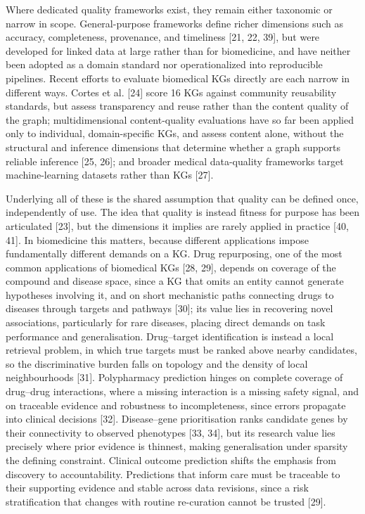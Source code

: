 Where dedicated quality frameworks exist, they remain either taxonomic or narrow in scope. General-purpose frameworks define richer dimensions such as accuracy, completeness, provenance, and timeliness {[}21, 22, 39{]}, but were developed for linked data at large rather than for biomedicine, and have neither been adopted as a domain standard nor operationalized into reproducible pipelines. Recent efforts to evaluate biomedical KGs directly are each narrow in different ways. Cortes et al. {[}24{]} score 16 KGs against community reusability standards, but assess transparency and reuse rather than the content quality of the graph; multidimensional content-quality evaluations have so far been applied only to individual, domain-specific KGs, and assess content alone, without the structural and inference dimensions that determine whether a graph supports reliable inference {[}25, 26{]}; and broader medical data-quality frameworks target machine-learning datasets rather than KGs {[}27{]}.

Underlying all of these is the shared assumption that quality can be defined once, independently of use. The idea that quality is instead fitness for purpose has been articulated {[}23{]}, but the dimensions it implies are rarely applied in practice {[}40, 41{]}. In biomedicine this matters, because different applications impose fundamentally different demands on a KG. Drug repurposing, one of the most common applications of biomedical KGs {[}28, 29{]}, depends on coverage of the compound and disease space, since a KG that omits an entity cannot generate hypotheses involving it, and on short mechanistic paths connecting drugs to diseases through targets and pathways {[}30{]}; its value lies in recovering novel associations, particularly for rare diseases, placing direct demands on task performance and generalisation. Drug--target identification is instead a local retrieval problem, in which true targets must be ranked above nearby candidates, so the discriminative burden falls on topology and the density of local neighbourhoods {[}31{]}. Polypharmacy prediction hinges on complete coverage of drug--drug interactions, where a missing interaction is a missing safety signal, and on traceable evidence and robustness to incompleteness, since errors propagate into clinical decisions {[}32{]}. Disease--gene prioritisation ranks candidate genes by their connectivity to observed phenotypes {[}33, 34{]}, but its research value lies precisely where prior evidence is thinnest, making generalisation under sparsity the defining constraint. Clinical outcome prediction shifts the emphasis from discovery to accountability. Predictions that inform care must be traceable to their supporting evidence and stable across data revisions, since a risk stratification that changes with routine re-curation cannot be trusted {[}29{]}.


